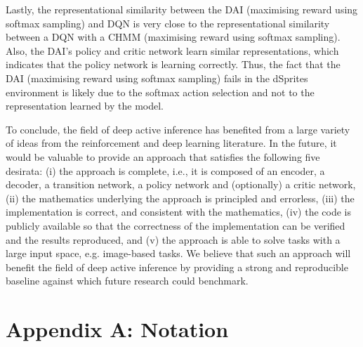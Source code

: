\documentclass[twoside,11pt]{article}
\begin{document}
Lastly, the representational similarity between the DAI (maximising reward using softmax sampling) and DQN is very close to the representational similarity between a DQN with a CHMM (maximising reward using softmax sampling). Also, the DAI's policy and critic network learn similar representations, which indicates that the policy network is learning correctly. Thus, the fact that the DAI (maximising reward using softmax sampling) fails in the dSprites environment is likely due to the softmax action selection and not to the representation learned by the model.

To conclude, the field of deep active inference has benefited from a large variety of ideas from the reinforcement and deep learning literature. In the future, it would be valuable to provide an approach that satisfies the following five desirata: (i) the approach is complete, i.e., it is composed of an encoder, a decoder, a transition network, a policy network and (optionally) a critic network, (ii) the mathematics underlying the approach is principled and errorless, (iii) the implementation is correct, and consistent with the mathematics, (iv) the code is publicly available so that the correctness of the implementation can be verified and the results reproduced, and (v) the approach is able to solve tasks with a large input space, e.g. image-based tasks. We believe that such an approach will benefit the field of deep active inference by providing a strong and reproducible baseline against which future research could benchmark.


\vskip 0.2in


\appendix

\section*{Appendix A: Notation}

\end{document}
